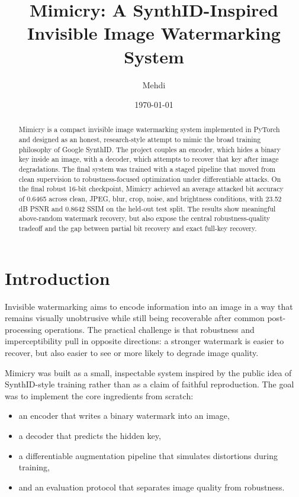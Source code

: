 \documentclass[11pt]{article}
\title{Mimicry: A SynthID-Inspired Invisible Image Watermarking System}
\author{Mehdi}
\date{\today}
\begin{document}
\maketitle

\begin{abstract}
Mimicry is a compact invisible image watermarking system implemented in PyTorch and designed as an honest, research-style attempt to mimic the broad training philosophy of Google SynthID. The project couples an encoder, which hides a binary key inside an image, with a decoder, which attempts to recover that key after image degradations. The final system was trained with a staged pipeline that moved from clean supervision to robustness-focused optimization under differentiable attacks. On the final robust 16-bit checkpoint, Mimicry achieved an average attacked bit accuracy of 0.6465 across clean, JPEG, blur, crop, noise, and brightness conditions, with 23.52 dB PSNR and 0.8642 SSIM on the held-out test split. The results show meaningful above-random watermark recovery, but also expose the central robustness-quality tradeoff and the gap between partial bit recovery and exact full-key recovery.
\end{abstract}

\section{Introduction}
Invisible watermarking aims to encode information into an image in a way that remains visually unobtrusive while still being recoverable after common post-processing operations. The practical challenge is that robustness and imperceptibility pull in opposite directions: a stronger watermark is easier to recover, but also easier to see or more likely to degrade image quality.

Mimicry was built as a small, inspectable system inspired by the public idea of SynthID-style training rather than as a claim of faithful reproduction. The goal was to implement the core ingredients from scratch:

\begin{itemize}[leftmargin=1.5em]
  \item an encoder that writes a binary watermark into an image,
  \item a decoder that predicts the hidden key,
  \item a differentiable augmentation pipeline that simulates distortions during training,
  \item and an evaluation protocol that separates image quality from robustness.
\end{itemize}
\end{document}
